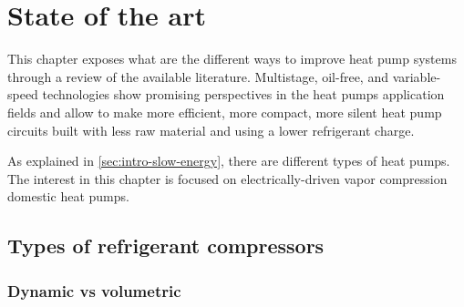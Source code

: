 \chapter{State of the art}
\label{chap:sota}
\resetallacronyms

\begin{shaded}
  This chapter exposes what are the different ways to improve heat
  pump systems through a review of the available
  literature. Multistage, oil-free, and variable-speed technologies
  show promising perspectives in the heat pumps application fields and
  allow to make more efficient, more compact, more silent heat pump
  circuits built with less raw material and using a lower refrigerant
  charge.
\end{shaded}

As explained in \cref{sec:intro-slow-energy}, there are different
types of heat pumps. The interest in this chapter is focused on
electrically-driven vapor compression domestic heat pumps.

\section{Types of refrigerant compressors}

\subsection{Dynamic vs volumetric}
\label{sec:sota-dyn-vs-vol}

